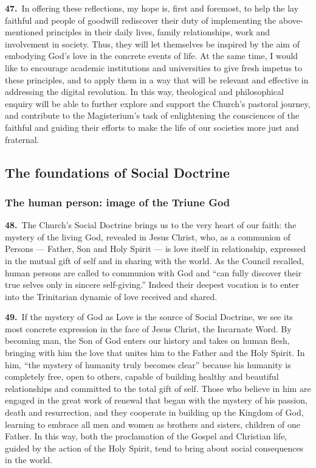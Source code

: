 \documentclass{article}
\begin{document}
\textbf{47.}\ In offering these reflections, my hope is, first and foremost, to help the lay faithful and people of goodwill rediscover their duty of implementing the above-mentioned principles in their daily lives, family relationships, work and involvement in society. Thus, they will let themselves be inspired by the aim of embodying God's love in the concrete events of life. At the same time, I would like to encourage academic institutions and universities to give fresh impetus to these principles, and to apply them in a way that will be relevant and effective in addressing the digital revolution. In this way, theological and philosophical enquiry will be able to further explore and support the Church's pastoral journey, and contribute to the Magisterium's task of enlightening the consciences of the faithful and guiding their efforts to make the life of our societies more just and fraternal.

\subsection{The foundations of Social Doctrine}

\subsubsection{The human person: image of the Triune God}

\textbf{48.}\ The Church's Social Doctrine brings us to the very heart of our faith: the mystery of the living God, revealed in Jesus Christ, who, as a communion of Persons --- Father, Son and Holy Spirit --- is love itself in relationship, expressed in the mutual gift of self and in sharing with the world.\cite{n51} As the Council recalled, human persons are called to communion with God and ``can fully discover their true selves only in sincere self-giving.''\cite{n52} Indeed their deepest vocation is to enter into the Trinitarian dynamic of love received and shared.

\textbf{49.}\ If the mystery of God as Love is the source of Social Doctrine, we see its most concrete expression in the face of Jesus Christ, the Incarnate Word. By becoming man, the Son of God enters our history and takes on human flesh, bringing with him the love that unites him to the Father and the Holy Spirit. In him, ``the mystery of humanity truly becomes clear''\cite{n53} because his humanity is completely free, open to others, capable of building healthy and beautiful relationships and committed to the total gift of self. Those who believe in him are engaged in the great work of renewal that began with the mystery of his passion, death and resurrection, and they cooperate in building up the Kingdom of God, learning to embrace all men and women as brothers and sisters, children of one Father. In this way, both the proclamation of the Gospel and Christian life, guided by the action of the Holy Spirit, tend to bring about social consequences in the world.\cite{n54}
\end{document}
